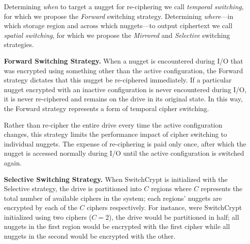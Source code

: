 Determining \emph{when} to target a nugget for re-ciphering we call
\emph{temporal switching}, for which we propose the \emph{Forward} switching
strategy. Determining \emph{where}---in which storage region and across which
nuggets---to output ciphertext we call \emph{spatial switching}, for which we
propose the \emph{Mirrored} and \emph{Selective} switching strategies.

\textbf{Forward Switching Strategy.} When a nugget is encountered during I/O
that was encrypted using something other than the active configuration, the
Forward strategy dictates that this nugget be re-ciphered immediately. If a
particular nugget encrypted with an inactive configuration is never encountered
during I/O, it is never re-ciphered and remains on the drive in its original
state. In this way, the Forward strategy represents a form of temporal cipher
switching.

Rather than re-cipher the entire drive every time the active configuration
changes, this strategy limits the performance impact of cipher switching to
individual nuggets. The expense of re-ciphering is paid only once, after which
the nugget is accessed normally during I/O until the active configuration is
switched again.


\textbf{Selective Switching Strategy.} When SwitchCrypt is initialized with the
Selective strategy, the drive is partitioned into $C$ regions where $C$
represents the total number of available ciphers in the system; each regions'
nuggets are encrypted by each of the $C$ ciphers respectively. For instance,
were SwitchCrypt initialized using two ciphers ($C = 2$), the drive would be
partitioned in half; all nuggets in the first region would be encrypted with the
first cipher while all nuggets in the second would be encrypted with the other.


